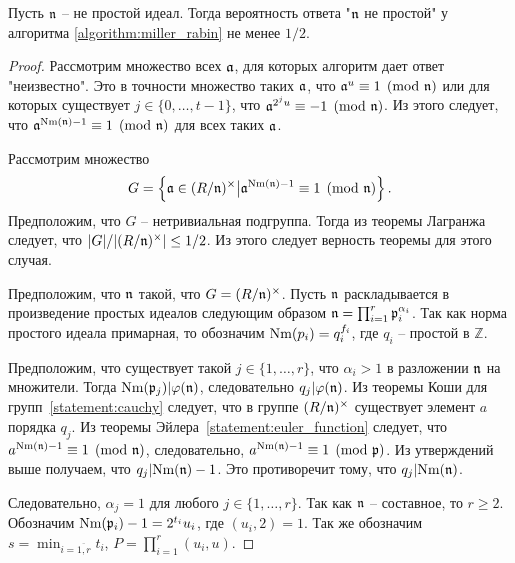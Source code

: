 \documentclass[_00_dissertation.tex]{subfiles}
\begin{document}
\begin{proposition}
    Пусть $\mathfrak{n}$ -- не простой идеал.
    Тогда вероятность ответа "$\mathfrak{n}$ не простой" у алгоритма \ref{algorithm:miller_rabin} не менее $1/2$.
\end{proposition}
\begin{proof}
    Рассмотрим множество всех $\mathfrak{a}$, для которых алгоритм дает ответ "неизвестно".
    Это в точности множество таких $\mathfrak{a}$, что $\mathfrak{a}^u \equiv 1 \pmod{\mathfrak{n}}$ или для которых существует $j \in \{0, \dots, t-1\}$, что $\mathfrak{a}^{2^{j}u} \equiv -1 \pmod{\mathfrak{n}}$.
    Из этого следует, что $\mathfrak{a}^{\textrm{Nm}(\mathfrak{n}) - 1} \equiv 1 \pmod{\mathfrak{n}}$ для всех таких $\mathfrak{a}$.

    Рассмотрим множество
    \begin{equation*}
        G = \left\{
            \mathfrak{a} \in (R/\mathfrak{n})^{\times} \big| \mathfrak{a}^{\textrm{Nm}(\mathfrak{n}) - 1} \equiv 1 \pmod{\mathfrak{n}}
        \right\}.
    \end{equation*}
    Предположим, что $G$ -- нетривиальная подгруппа.
    Тогда из теоремы Лагранжа следует, что $|G| / |(R/\mathfrak{n})^{\times}| \le 1/2$.
    Из этого следует верность теоремы для этого случая.

    Предположим, что $\mathfrak{n}$ такой, что $G = (R/\mathfrak{n})^{\times}$.
    Пусть $\mathfrak{n}$ раскладывается в произведение простых идеалов следующим образом $\mathfrak{n} = \prod_{i=1}^r \mathfrak{p}_i^{\alpha_i}$.
    Так как норма простого идеала примарная, то обозначим $\textrm{Nm}(p_i) = q_i^{f_i}$, где $q_i$ -- простой в $\mathbb{Z}$.

    Предположим, что существует такой $j \in \{1, \dots, r\}$, что $\alpha_i > 1$ в разложении $\mathfrak{n}$ на множители.
    Тогда $\textrm{Nm}(\mathfrak{p}_j) | \varphi(\mathfrak{n})$, следовательно $q_j | \varphi(\mathfrak{n})$.
    Из теоремы Коши для групп~\ref{statement:cauchy} следует, что в группе $(R/\mathfrak{n})^{\times}$ существует элемент $a$ порядка $q_j$.
    Из теоремы Эйлера~\ref{statement:euler_function} следует, что $a^{\textrm{Nm}(\mathfrak{n}) - 1} \equiv 1 \pmod{\mathfrak{n}}$, следовательно, $a^{\textrm{Nm}(\mathfrak{n}) - 1} \equiv 1 \pmod{\mathfrak{p}}$.
    Из утверждений выше получаем, что $q_j | \textrm{Nm}(\mathfrak{n}) - 1$.
    Это противоречит тому, что $q_j | \textrm{Nm}(\mathfrak{n})$.

    Следовательно, $\alpha_j = 1$ для любого $j \in \{1, \dots, r\}$.
    Так как $\mathfrak{n}$ -- составное, то $r \ge 2$.
    Обозначим $\textrm{Nm}(\mathfrak{p}_i) - 1 = 2^{t_i} u_i$, где $(u_i, 2) = 1$.
    Так же обозначим $s = \min_{i=\overline{1, r}} t_i$, $P = \prod_{i=1}^r (u_i, u)$.


\end{proof}
\end{document}
